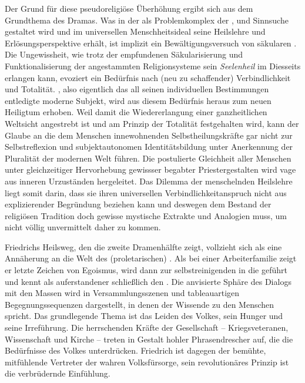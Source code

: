 Der Grund für diese pseudoreligiöse Überhöhung ergibt sich aus dem Grundthema
des Dramas. Was in der  als Problemkomplex der
\Cite{Zerrissenheit}, \Cite{Heimatlosigkeit} und Sinnsuche gestaltet wird und
im universellen Menschheitsideal seine Heilslehre und Erlösungsperspektive erhält,   
ist implizit ein Bewältigungsversuch von säkularen .  
Die Ungewissheit, wie \Cite{der Mensch} trotz der empfundenen Säkularisierung
und Funktionalisierung der angestammten Religionsysteme sein \emph{Seelenheil}
im Diesseits erlangen kann, evoziert ein Bedürfnis nach (neu zu schaffender)
Verbindlichkeit und Totalität. 
\Cite{Der Mensch}, also eigentlich das all seinen individuellen
Bestimmungen entledigte moderne Subjekt, wird aus diesem Bedürfnis heraus zum
neuen Heiligtum erhoben. Weil damit die Wiedererlangung einer ganzheitlichen
Weltsicht angestrebt ist und am Prinzip der Totalität festgehalten wird, kann
der Glaube an die dem Menschen innewohnenden Selbstheilungskräfte gar nicht zur
Selbstreflexion und subjektautonomen Identitätsbildung unter Anerkennung der
Pluralität der modernen Welt führen. 
Die postulierte Gleichheit aller Menschen unter gleichzeitiger Hervorhebung
gewissser begabter Priestergestalten wird vage aus inneren Urzuständen
hergeleitet. Das Dilemma der menschelnden Heilslehre liegt somit darin, dass
sie ihren universellen Verbindlichkeitanspruch nicht aus explizierender
Begründung beziehen kann und deswegen dem Bestand der religiösen Tradition
doch gewisse mystische Extrakte und Analogien  muss, um nicht völlig
unvermittelt daher zu kommen.


Friedrichs Heilsweg, den die zweite Dramenhälfte zeigt, vollzieht sich als eine
Annäherung an die Welt des (proletarischen) \Cite{Volkes} .  
Als \Cite{Schlafbursche} 
bei einer Arbeiterfamilie zeigt er letzte Zeichen von Egoismus, wird
dann zur selbstreinigenden \Cite{Arbeit} in die \Cite{große Fabrik} geführt 
und kennt als auferstandener \Cite{Wanderer} schließlich den \Cite{Weg zur
  Arbeitsstätte} . 
Die anvisierte Sphäre des Dialogs mit den Massen wird in
Versammlungsszenen und tableauartigen Begegnungssequenzen dargestellt, in
denen der Wissende zu den Menschen spricht. Das grundlegende Thema ist das
Leiden des Volkes, sein Hunger und seine Irreführung. Die herrschenden Kräfte
der Gesellschaft -- Kriegsveteranen, Wissenschaft und Kirche -- treten in Gestalt
hohler Phrasendrescher auf, die die Bedürfnisse des Volkes
unterdrücken. Friedrich ist dagegen der bemühte, mitfühlende Vertreter der
wahren Volksfürsorge, sein revolutionäres Prinzip ist die verbrüdernde
Einfühlung.

